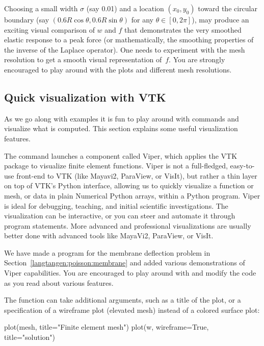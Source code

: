 Choosing a small width $\sigma$ (say 0.01) and a location $(x_0,y_0)$
toward the circular boundary (say $(0.6R\cos\theta, 0.6R\sin\theta)$
for any $\theta\in [0,2\pi]$), may produce an exciting visual
comparison of $w$ and $f$ that demonstrates the very smoothed elastic
response to a peak force (or mathematically, the smoothing properties
of the inverse of the Laplace operator).  One needs to experiment with
the mesh resolution to get a smooth visual representation of~$f$.  You
are strongly encouraged to play around with the plots and different
mesh resolutions.

\subsection{Quick visualization with VTK}
\label{langtangen:quickviz}

As we go along with examples it is fun to play around with 
commands and visualize what is computed. This section explains some
useful visualization features.

The  command launches a \fenics{} component called Viper,
which applies the VTK package to visualize finite element functions.
Viper is not a full-fledged, easy-to-use front-end to VTK (like
Mayavi2, ParaView, or VisIt), but rather a thin layer on top of VTK's
Python interface, allowing us to quickly visualize a \dolfin{}
function or mesh, or data in plain Numerical Python arrays, within a
Python program.  Viper is ideal for debugging, teaching, and initial
scientific investigations.  The visualization can be interactive, or
you can steer and automate it through program statements.  More
advanced and professional visualizations are usually better done with
advanced tools like MayaVi2, ParaView, or VisIt.

We have made a program  for the membrane deflection
problem in Section~\ref{langtangen:poisson:membrane} and added various
demonstrations of Viper capabilities. You are encouraged to play around
with  and modify the code as you read about various
features.

The  function can take additional arguments, such as a title
of the plot, or a specification of a wireframe plot (elevated mesh)
instead of a colored surface plot:
\begin{python}
plot(mesh, title="Finite element mesh")
plot(w, wireframe=True, title="solution")
\end{python}

